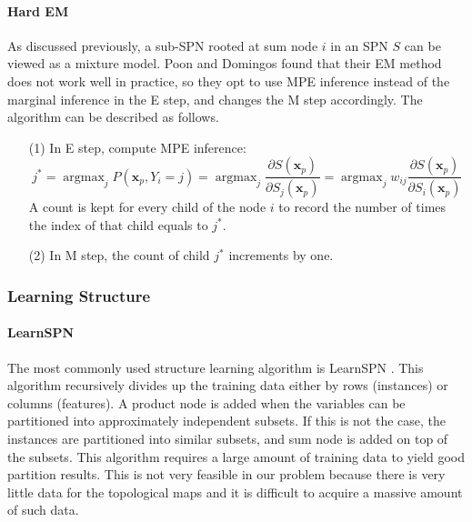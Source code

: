 \documentclass[11pt, titlepage]{article}
\theoremstyle{definition}
\newcommand\mb{\mathbf}
\DeclareMathOperator*{\argmax}{argmax}
\begin{document}
\paragraph{Hard EM} As discussed previously, a sub-SPN rooted at sum node $i$ in an SPN $S$ can be viewed as a mixture model. 
Poon and Domingos found that their EM method does not work well in practice, so they opt to use MPE inference instead of the marginal inference in the E step, and changes the M step accordingly. The algorithm can be described as follows.

\begin{enumerate}
    \item[(1)] In E step, compute MPE inference:
        \begin{equation}
        j^*=\argmax_j P(\mb{x}_p, Y_i=j)=\argmax_j\frac{\partial S(\mb{x}_p)}{\partial S_j(\mb{x}_p)}=\argmax_j w_{ij}\frac{\partial S(\mb{x}_p)}{\partial S_i(\mb{x}_p)}
        \end{equation}
        A count is kept for every child of the node $i$ to record the number of times the index of that child equals to $j^*$.
        
    \item[(2)] In M step, the count of child $j^*$ increments by one.
\end{enumerate}

\subsubsection{Learning Structure}

\paragraph{LearnSPN}
The most commonly used structure learning algorithm is LearnSPN \cite{gens2013learning}. This algorithm recursively divides up the training data either by rows (instances) or columns (features). A product node is added when the variables can be partitioned into approximately independent subsets. If this is not the case, the instances are partitioned into similar subsets, and sum node is added on top of the subsets. This algorithm requires a large amount of training data to yield good partition results. This is not very feasible in our problem because there is very little data for the topological maps and it is difficult to acquire a massive amount of such data.
\end{document}
